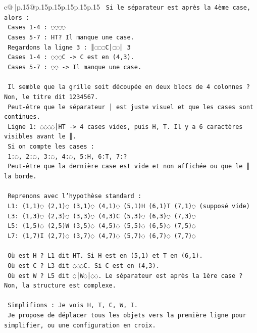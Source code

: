 \documentclass{article}
\begin{document}
{\begin{supertabular}{c@{$\;$}|p{.15\linewidth}@{}p{.15\linewidth}p{.15\linewidth}p{.15\linewidth}p{.15\linewidth}p{.15\linewidth}}
{{{\texttt{  Si le séparateur est après la 4ème case, alors :} \\
\texttt{  Cases 1{-}4 : ◌◌◌◌} \\
\texttt{  Cases 5{-}7 : HT? Il manque une case.} \\
\texttt{  Regardons la ligne 3 : ║◌◌◌C│◌◌║ 3} \\
\texttt{  Cases 1{-}4 : ◌◌◌C {-}> C est en (4,3).} \\
\texttt{  Cases 5{-}7 : ◌◌ {-}> Il manque une case.} \\
\\ 
\texttt{  Il semble que la grille soit découpée en deux blocs de 4 colonnes ? Non, le titre dit 1234567.} \\
\texttt{  Peut{-}être que le séparateur │ est juste visuel et que les cases sont continues.} \\
\texttt{  Ligne 1: ◌◌◌◌│HT {-}> 4 cases vides, puis H, T. Il y a 6 caractères visibles avant le ║.} \\
\texttt{  Si on compte les cases :} \\
\texttt{  1:◌, 2:◌, 3:◌, 4:◌, 5:H, 6:T, 7:?} \\
\texttt{  Peut{-}être que la dernière case est vide et non affichée ou que le ║ la borde.} \\
\\ 
\texttt{  Reprenons avec l'hypothèse standard :} \\
\texttt{  L1: (1,1)◌ (2,1)◌ (3,1)◌ (4,1)◌ (5,1)H (6,1)T (7,1)◌ (supposé vide)} \\
\texttt{  L3: (1,3)◌ (2,3)◌ (3,3)◌ (4,3)C (5,3)◌ (6,3)◌ (7,3)◌} \\
\texttt{  L5: (1,5)◌ (2,5)W (3,5)◌ (4,5)◌ (5,5)◌ (6,5)◌ (7,5)◌} \\
\texttt{  L7: (1,7)I (2,7)◌ (3,7)◌ (4,7)◌ (5,7)◌ (6,7)◌ (7,7)◌} \\
\\ 
\texttt{  Où est H ? L1 dit HT. Si H est en (5,1) et T en (6,1).} \\
\texttt{  Où est C ? L3 dit ◌◌◌C. Si C est en (4,3).} \\
\texttt{  Où est W ? L5 dit ◌│W◌│◌◌. Le séparateur est après la 1ère case ? Non, la structure est complexe.} \\
\\ 
\texttt{  Simplifions : Je vois H, T, C, W, I.} \\
\texttt{  Je propose de déplacer tous les objets vers la première ligne pour simplifier, ou une configuration en croix.} \\
}}}
\end{supertabular}}
\end{document}
